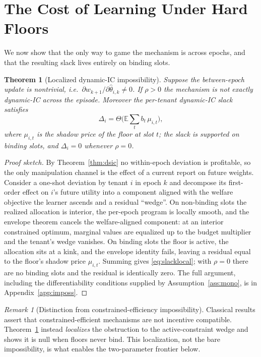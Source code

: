 \documentclass[conference]{IEEEtran}
\newtheorem{theorem}{Theorem}
\theoremstyle{definition}
\theoremstyle{remark}
\newtheorem{remark}{Remark}
\newcommand{\rhobind}{\rho}
\newcommand{\type}{\theta}
\newcommand{\wt}{w}
\newcommand{\bindind}{b}
\newcommand{\Slack}{\Delta}
\newcommand{\E}{\mathbb{E}}
\begin{document}
\section{The Cost of Learning Under Hard Floors}\label{sec:imposs}

We now show that the only way to game the mechanism is across epochs, and that the resulting slack lives entirely on binding slots.

\begin{theorem}[Localized dynamic-IC impossibility]\label{thm:imposs}
Suppose the between-epoch update is nontrivial, i.e.\ $\partial\wt_{k+1}/\partial\hat\type_{i,k}\neq0$. If $\rhobind>0$ the mechanism is not exactly dynamic-IC across the episode. Moreover the per-tenant dynamic-IC slack satisfies
\begin{equation}\label{eq:slacklocal}
\Slack_i=\Theta\!\Big(\E\sum_{t}\bindind_t\,\mu_{i,t}\Big),
\end{equation}
where $\mu_{i,t}$ is the shadow price of the floor at slot $t$; the slack is supported on binding slots, and $\Slack_i=0$ whenever $\rhobind=0$.
\end{theorem}

\begin{proof}[Proof sketch]
By Theorem~\ref{thm:dsic} no within-epoch deviation is profitable, so the only manipulation channel is the effect of a current report on future weights. Consider a one-shot deviation by tenant $i$ in epoch $k$ and decompose its first-order effect on $i$'s future utility into a component aligned with the welfare objective the learner ascends and a residual ``wedge''. On non-binding slots the realized allocation is interior, the per-epoch program is locally smooth, and the envelope theorem cancels the welfare-aligned component: at an interior constrained optimum, marginal values are equalized up to the budget multiplier and the tenant's wedge vanishes. On binding slots the floor is active, the allocation sits at a kink, and the envelope identity fails, leaving a residual equal to the floor's shadow price $\mu_{i,t}$. Summing gives \eqref{eq:slacklocal}; with $\rhobind=0$ there are no binding slots and the residual is identically zero. The full argument, including the differentiability conditions supplied by Assumption~\ref{ass:mono}, is in Appendix~\ref{app:imposs}.
\end{proof}

\begin{remark}[Distinction from constrained-efficiency impossibility]
Classical results assert that constrained-efficient mechanisms are not incentive compatible. Theorem~\ref{thm:imposs} instead \emph{localizes} the obstruction to the active-constraint wedge and shows it is null when floors never bind. This localization, not the bare impossibility, is what enables the two-parameter frontier below.
\end{remark}
\end{document}

